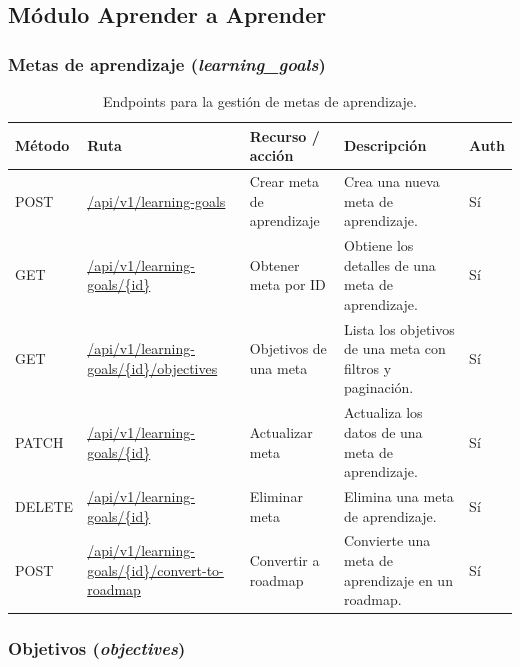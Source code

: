 \subsection*{Módulo Aprender a Aprender}

\subsubsection*{Metas de aprendizaje (\textit{learning\_goals})}

\begin{table}[H]
\centering
\footnotesize
\setlength{\tabcolsep}{4pt}
\renewcommand{\arraystretch}{1.25}
\begin{tabular}{|p{1.4cm}|p{4.1cm}|p{3.2cm}|p{5.8cm}|p{1cm}|}
\hline
\textbf{Método} & \textbf{Ruta} & \textbf{Recurso / acción} & \textbf{Descripción} & \textbf{Auth} \\
\hline

POST & \url{/api/v1/learning-goals} & Crear meta de aprendizaje &
Crea una nueva meta de aprendizaje. &
Sí \\
\hline

GET & \url{/api/v1/learning-goals/{id}} & Obtener meta por ID &
Obtiene los detalles de una meta de aprendizaje. &
Sí \\
\hline

GET & \url{/api/v1/learning-goals/{id}/objectives} & Objetivos de una meta &
Lista los objetivos de una meta con filtros y paginación. &
Sí \\
\hline

PATCH & \url{/api/v1/learning-goals/{id}} & Actualizar meta &
Actualiza los datos de una meta de aprendizaje. &
Sí \\
\hline

DELETE & \url{/api/v1/learning-goals/{id}} & Eliminar meta &
Elimina una meta de aprendizaje. &
Sí \\
\hline

POST & \url{/api/v1/learning-goals/{id}/convert-to-roadmap} & Convertir a roadmap &
Convierte una meta de aprendizaje en un roadmap. &
Sí \\
\hline

\end{tabular}
\caption{Endpoints para la gestión de metas de aprendizaje.}
\end{table}

\subsubsection*{Objetivos (\textit{objectives})}

